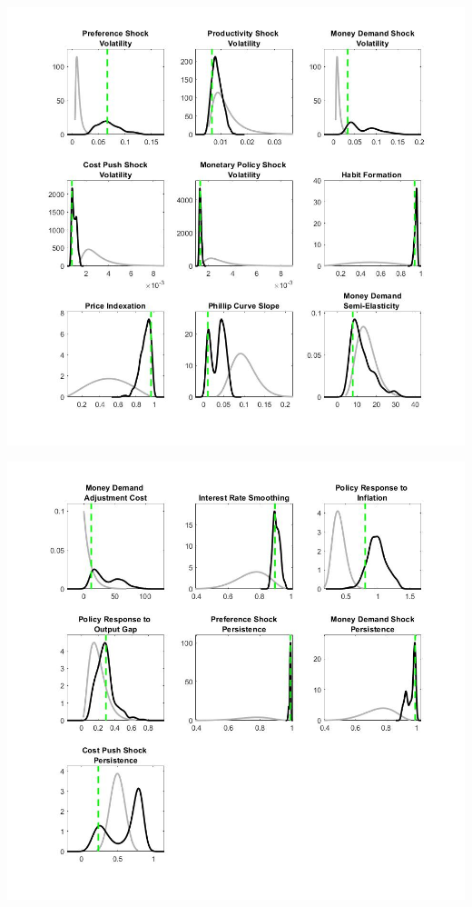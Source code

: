 \documentclass[11pt,preprint, authoryear]{elsarticle}
\let\origfigure\figure
\let\endorigfigure\endfigure
\renewenvironment{figure}[1][2] {
    \expandafter\origfigure\expandafter[H]
} {
    \endorigfigure
}
\numberwithin{equation}{section}
\numberwithin{figure}{section}
\numberwithin{table}{section}
\begin{document}
\begin{figure}
    \centering 
    \begin{minipage}[t]{8.2cm} 
        \centering 
        \includegraphics[width=\linewidth]{tay_pp1.jpg} 
    \end{minipage} 
    \hspace{0.1cm} 
    \begin{minipage}[t]{8.2cm} 
        \centering 
        \includegraphics[width=\linewidth]{tay_pp2.jpg} 
    \end{minipage}
    \caption{Priors and Posterior: Taylor Rule}
    \label{tay_pp}
\end{figure}
\end{document}
